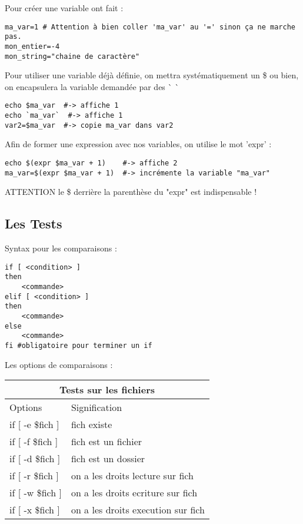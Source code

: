 \documentclass{article}
\begin{document}
Pour créer une variable ont fait :

\begin{verbatim}
ma_var=1 # Attention à bien coller 'ma_var' au '=' sinon ça ne marche pas.
mon_entier=-4
mon_string="chaine de caractère"
\end{verbatim}

Pour utiliser une variable déjà définie, on mettra systématiquement un \$ ou bien, on encapsulera la variable demandée par des \`{} \`{}

\begin{verbatim}
echo $ma_var  #-> affiche 1
echo `ma_var`  #-> affiche 1
var2=$ma_var  #-> copie ma_var dans var2
\end{verbatim}

Afin de former une expression avec nos variables, on utilise le mot 'expr' :

\begin{verbatim}
echo $(expr $ma_var + 1)    #-> affiche 2
ma_var=$(expr $ma_var + 1)  #-> incrémente la variable "ma_var"
\end{verbatim}

ATTENTION le \$ derrière la parenthèse du "expr" est indispensable !

\subsection{Les Tests}

Syntax pour les comparaisons :

\begin{verbatim}
if [ <condition> ]
then
    <commande>
elif [ <condition> ]
then
    <commande>
else
    <commande>
fi #obligatoire pour terminer un if
\end{verbatim}

Les options de comparaisons :

\begin{tabular}{ |p{4cm}||p{4cm}| }
 \hline
 \multicolumn{2}{|c|}{Tests sur les fichiers} \\
 \hline
  Options & Signification \\
 \hline
  if [ -e \$fich ] & fich existe\\
 \hline
  if [ -f \$fich ] & fich est un fichier\\
 \hline
  if [ -d \$fich ] & fich est un dossier\\
 \hline
  if [ -r \$fich ] & on a les droits lecture sur fich\\
 \hline
  if [ -w \$fich ] & on a les droits ecriture sur fich\\
 \hline
  if [ -x \$fich ] & on a les droits execution sur fich\\
 \hline
\end{tabular}
\end{document}
